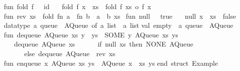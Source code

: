 \begin{isabellebody}
\begin{isamarkuptext}
\isanewline
fun\ fold\ f\ {\isacharbrackleft}{\isacharbrackright}\ {\isacharequal}\ id\isanewline
\ \ {\isacharbar}\ fold\ f\ {\isacharparenleft}x\ {\isacharcolon}{\isacharcolon}\ xs{\isacharparenright}\ {\isacharequal}\ fold\ f\ xs\ o\ f\ x{\isacharsemicolon}\isanewline
\isanewline
fun\ rev\ xs\ {\isacharequal}\ fold\ {\isacharparenleft}fn\ a\ {\isacharequal}{\isachargreater}\ fn\ b\ {\isacharequal}{\isachargreater}\ a\ {\isacharcolon}{\isacharcolon}\ b{\isacharparenright}\ xs\ {\isacharbrackleft}{\isacharbrackright}{\isacharsemicolon}\isanewline
\isanewline
fun\ null\ {\isacharbrackleft}{\isacharbrackright}\ {\isacharequal}\ true\isanewline
\ \ {\isacharbar}\ null\ {\isacharparenleft}x\ {\isacharcolon}{\isacharcolon}\ xs{\isacharparenright}\ {\isacharequal}\ false{\isacharsemicolon}\isanewline
\isanewline
datatype\ {\isacharprime}a\ queue\ {\isacharequal}\ AQueue\ of\ {\isacharprime}a\ list\ {\isacharasterisk}\ {\isacharprime}a\ list{\isacharsemicolon}\isanewline
\isanewline
val\ empty\ {\isacharcolon}\ {\isacharprime}a\ queue\ {\isacharequal}\ AQueue\ {\isacharparenleft}{\isacharbrackleft}{\isacharbrackright}{\isacharcomma}\ {\isacharbrackleft}{\isacharbrackright}{\isacharparenright}{\isacharsemicolon}\isanewline
\isanewline
fun\ dequeue\ {\isacharparenleft}AQueue\ {\isacharparenleft}xs{\isacharcomma}\ y\ {\isacharcolon}{\isacharcolon}\ ys{\isacharparenright}{\isacharparenright}\ {\isacharequal}\ {\isacharparenleft}SOME\ y{\isacharcomma}\ AQueue\ {\isacharparenleft}xs{\isacharcomma}\ ys{\isacharparenright}{\isacharparenright}\isanewline
\ \ {\isacharbar}\ dequeue\ {\isacharparenleft}AQueue\ {\isacharparenleft}xs{\isacharcomma}\ {\isacharbrackleft}{\isacharbrackright}{\isacharparenright}{\isacharparenright}\ {\isacharequal}\isanewline
\ \ \ \ {\isacharparenleft}if\ null\ xs\ then\ {\isacharparenleft}NONE{\isacharcomma}\ AQueue\ {\isacharparenleft}{\isacharbrackleft}{\isacharbrackright}{\isacharcomma}\ {\isacharbrackleft}{\isacharbrackright}{\isacharparenright}{\isacharparenright}\isanewline
\ \ \ \ \ \ else\ dequeue\ {\isacharparenleft}AQueue\ {\isacharparenleft}{\isacharbrackleft}{\isacharbrackright}{\isacharcomma}\ rev\ xs{\isacharparenright}{\isacharparenright}{\isacharparenright}{\isacharsemicolon}\isanewline
\isanewline
fun\ enqueue\ x\ {\isacharparenleft}AQueue\ {\isacharparenleft}xs{\isacharcomma}\ ys{\isacharparenright}{\isacharparenright}\ {\isacharequal}\ AQueue\ {\isacharparenleft}x\ {\isacharcolon}{\isacharcolon}\ xs{\isacharcomma}\ ys{\isacharparenright}{\isacharsemicolon}\isanewline
\isanewline
end{\isacharsemicolon}\ {\isacharparenleft}{\isacharasterisk}struct\ Example{\isacharasterisk}{\isacharparenright}\isanewline%

\end{isamarkuptext}
\end{isabellebody}
